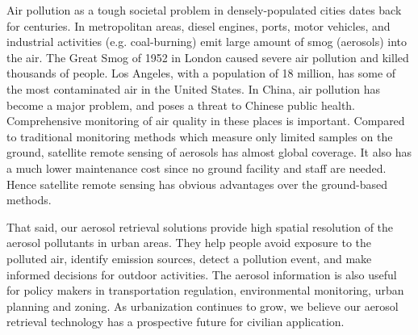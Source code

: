 Air pollution as a tough societal problem in densely-populated cities dates back for centuries. In metropolitan areas, diesel engines, ports, motor vehicles, and industrial activities (e.g. coal-burning) emit large amount of smog (aerosols) into the air. The Great Smog of 1952 in London caused severe air pollution and killed thousands of people. Los Angeles, with a population of 18 million, has some of the most contaminated air in the United States. In China, air pollution has become a major problem, and poses a threat to Chinese public health. Comprehensive monitoring of air quality in these places is important. Compared to traditional monitoring methods which measure only limited samples on the ground, satellite remote sensing of aerosols has almost global coverage. It also has a much lower maintenance cost since no ground facility and staff are needed. Hence satellite remote sensing has obvious advantages over the ground-based methods.

That said, our aerosol retrieval solutions provide high spatial resolution of the aerosol pollutants in urban areas. They help people avoid exposure to the polluted air, identify emission sources, detect a pollution event, and make informed decisions for outdoor activities. The aerosol information is also useful for policy makers in transportation regulation, environmental monitoring, urban planning and zoning. As urbanization continues to grow, we believe our aerosol retrieval technology has a prospective future for civilian application.
